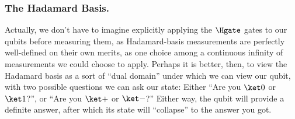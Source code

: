 
    \subsubsection{The Hadamard Basis.}
      Actually, we don't have to imagine explicitly applying the $\Hgate$ gates
        to our qubits before measuring them, as Hadamard-basis measurements
        are perfectly well-defined on their own merits, as one choice among a
        continuous infinity of measurements we could choose to apply.
        Perhaps it is better, then, to view the Hadamard basis as a sort of
        ``dual domain'' under which we can view our qubit,
	      with two possible questions we can ask our state: 
	      Either ``Are you $\ket 0$ or $\ket 1$?'', or 
	      ``Are you $\ket +$ or $\ket -$?'' Either way, 
	      the qubit will provide a definite answer, after which its state will 
        ``collapse'' to the answer you got.

